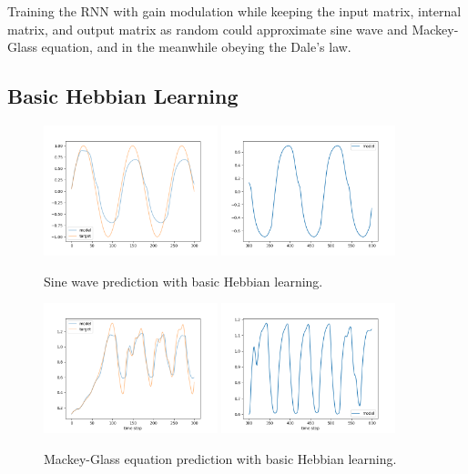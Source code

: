 \documentclass[12pt, a4paper]{article}
\begin{document}
Training the RNN with gain modulation while keeping the input matrix, internal matrix, and output matrix as random could approximate sine wave and Mackey-Glass equation, and in the meanwhile obeying the Dale's law.

\subsection*{Basic Hebbian Learning}

\begin{figure}[H]
    \centering
    \includegraphics[width=0.45\textwidth]{fig/sin_hebb_train.png}
    \includegraphics[width=0.45\textwidth]{fig/sin_hebb_pred.png}
    \caption{Sine wave prediction with basic Hebbian learning.}
\end{figure}

\begin{figure}[H]
    \centering
    \includegraphics[width=0.45\textwidth]{fig/MG_hebb_train.png}
    \includegraphics[width=0.45\textwidth]{fig/MG_hebb_pred.png}
    \caption{Mackey-Glass equation prediction with basic Hebbian learning.}
    \label{fig:3}
\end{figure}
\end{document}
